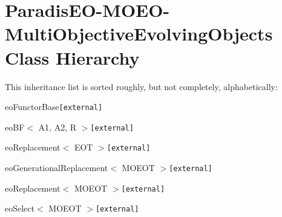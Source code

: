 \section{Paradis\-EO-MOEO-Multi\-Objective\-Evolving\-Objects Class Hierarchy}
This inheritance list is sorted roughly, but not completely, alphabetically:\begin{CompactList}
\item eo\-Functor\-Base{\tt  [external]}\begin{CompactList}
\item eo\-BF$<$ A1, A2, R $>${\tt  [external]}\begin{CompactList}
\item eo\-Replacement$<$ EOT $>${\tt  [external]}\begin{CompactList}
\item eo\-Generational\-Replacement$<$ MOEOT $>${\tt  [external]}\begin{CompactList}
\item {}
\end{CompactList}
\end{CompactList}
\item eo\-Replacement$<$ MOEOT $>${\tt  [external]}\begin{CompactList}
\item {}
\begin{CompactList}
\item {}
\item {}
\item {}
\end{CompactList}
\end{CompactList}
\item eo\-Select$<$ MOEOT $>${\tt  [external]}\begin{CompactList}
\item {}
\end{CompactList}
\item {}

\end{CompactList}
\end{CompactList}
\end{CompactList}
